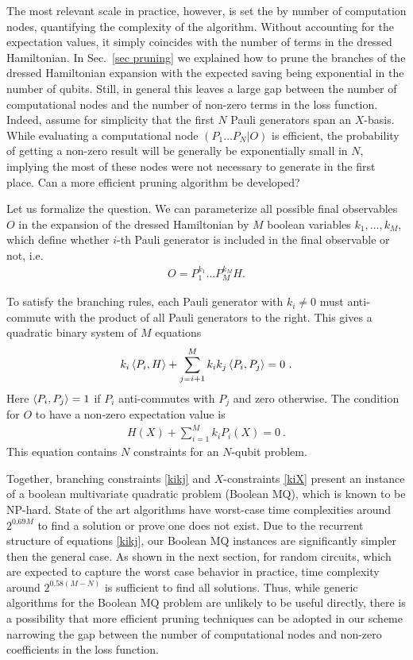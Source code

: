 \documentclass[twocolumn, amsfonts, amssymb, aps, nofootinbib]{revtex4-2}
\begin{document}
The most relevant scale in practice, however, is set the by number of computation nodes, quantifying the complexity of the algorithm. Without accounting for the expectation values, it simply coincides with the number of terms in the dressed Hamiltonian. In Sec.~\ref{sec pruning} we explained how to prune the branches of the dressed Hamiltonian expansion with the expected saving being exponential in the number of qubits. Still, in general this leaves a large gap between the number of computational nodes and the number of non-zero terms in the loss function. Indeed, assume for simplicity that the first $N$ Pauli generators span an $X$-basis. While evaluating a computational node $(P_1\dots P_N|O)$ is efficient, the probability of getting a non-zero result will be generally be exponentially small in $N$, implying the most of these nodes were not necessary to generate in the first place. Can a more efficient pruning algorithm be developed?

Let us formalize the question. We can parameterize all possible final observables $O$ in the expansion of the dressed Hamiltonian by $M$ boolean variables $k_1,\dots, k_M$, which define whether $i$-th Pauli generator is included in the final observable or not, i.e. 
\begin{align}
	O=P_1^{k_1}\dots P_M^{k_M}H  .
\end{align}

To satisfy the branching rules, each Pauli generator with $k_i\neq 0$ must anti-commute with the product of all Pauli generators to the right. This gives a quadratic binary system of $M$ equations 
\begin{align}
	k_i\braket{P_i, H}+\sum_{j=i+1}^M k_ik_j \braket{P_i, P_j}=0 \ . \label{kikj}
\end{align}
Here $\braket{P_i, P_j}=1$ if $P_i$ anti-commutes with $P_j$ and zero otherwise. The condition for $O$ to have a non-zero expectation value is 
\begin{align}
	H(X)+\sum_{i=1}^M k_i P_i(X)=0 \ . \label{kiX}
\end{align}
This equation contains $N$ constraints for an $N$-qubit problem.

Together, branching constraints \eqref{kikj} and $X$-constraints \eqref{kiX} present an instance of a boolean multivariate quadratic problem (Boolean MQ), which is known to be NP-hard. State of the art algorithms \cite{Dinur2020, Barbero2022} have worst-case time complexities around $2^{0.69M}$ to find a solution or prove one does not exist. Due to the recurrent structure of equations \eqref{kikj}, our Boolean MQ instances are significantly simpler then the general case. As shown in the next section, for random circuits, which are expected to capture the worst case behavior in practice, time complexity around $2^{0.58(M-N)}$ is sufficient to find all solutions. Thus, while generic algorithms for the Boolean MQ problem are unlikely to be useful directly, there is a possibility that more efficient pruning techniques can be adopted in our scheme narrowing the gap between the number of computational nodes and non-zero coefficients in the loss function.
\end{document}
